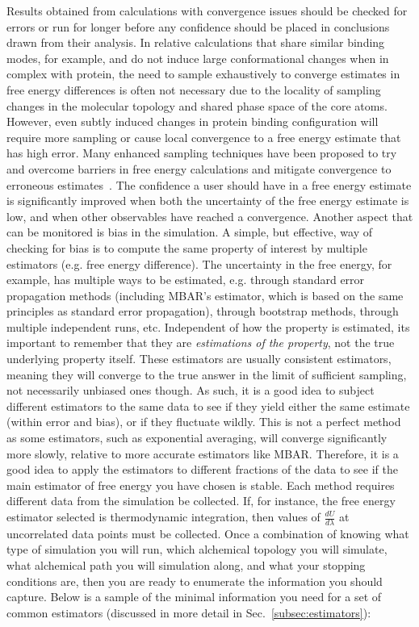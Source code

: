 \documentclass[9pt,bestpractices]{livecoms}
\begin{document}
Results obtained from calculations with convergence issues should be checked for errors or run for longer before any confidence should be placed in conclusions drawn from their analysis.
In relative calculations that share similar binding modes, for example, and do not induce large conformational changes when in complex with protein, the need to sample exhaustively to converge estimates in free energy differences is often not necessary due to the locality of sampling changes in the molecular topology and shared phase space of the core atoms.
However, even subtly induced changes in protein binding configuration will require more sampling or cause local convergence to a free energy estimate that has high error.
Many enhanced sampling techniques have been proposed to try and overcome barriers in free energy calculations and mitigate convergence to erroneous estimates~\cite{}. 
The confidence a user should have in a free energy estimate is significantly improved when both the uncertainty of the free energy estimate is low, and when other observables have reached a convergence.
%
Another aspect that can be monitored is bias in the simulation. A simple, but effective, way of checking for bias is to compute the same property of interest by multiple estimators (e.g. free energy difference). 
The uncertainty in the free energy, for example, has multiple ways to be estimated, e.g. through standard error propagation methods (including MBAR's estimator, which is based on the same principles as standard error propagation), through bootstrap methods, through multiple independent runs, etc. 
Independent of how the property is estimated, its important to remember that they are \textit{estimations of the property}, not the true underlying property itself. 
These estimators are usually consistent estimators, meaning they will converge to the true answer in the limit of sufficient sampling, not necessarily unbiased ones though.
As such, it is a good idea to subject different estimators to the same data to see if they yield either the same estimate (within error and bias), or if they fluctuate wildly. 
This is not a perfect method as some estimators, such as exponential averaging, will converge significantly more slowly, relative to more accurate estimators like MBAR. 
Therefore, it is a good idea to apply the estimators to different fractions of the data to see if the main estimator of free energy you have chosen is stable.
%
Each method requires different data from the simulation be collected.  If, for instance, the free energy estimator selected is thermodynamic integration, then values of $\frac{dU}{d\lambda}$ at uncorrelated data points must be collected. Once a combination of knowing what type of simulation you will run, which alchemical topology you will simulate, what alchemical path you will simulation along, and what your stopping conditions are, then you are ready to enumerate the information you should capture. Below is a sample of the minimal information you need for a set of common estimators (discussed in more detail in Sec.~\ref{subsec:estimators}):
\end{document}
